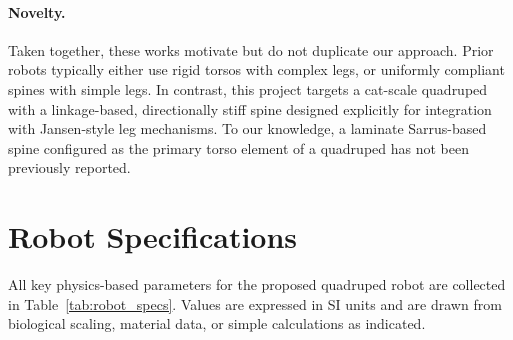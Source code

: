 \documentclass[11pt,letterpaper]{article}
\begin{document}
\paragraph{Novelty.}
Taken together, these works motivate but do not duplicate our approach. Prior robots typically either
use rigid torsos with complex legs, or uniformly compliant spines with simple legs. In contrast, this
project targets a cat-scale quadruped with a linkage-based, directionally stiff spine designed explicitly
for integration with Jansen-style leg mechanisms. To our knowledge, a laminate Sarrus-based spine
configured as the primary torso element of a quadruped has not been previously reported.

\section{Robot Specifications}
\label{sec:specs}

All key physics-based parameters for the proposed quadruped robot are collected
in Table~\ref{tab:robot_specs}. Values are expressed in SI units and are drawn
from biological scaling, material data, or simple calculations as indicated.
\end{document}
